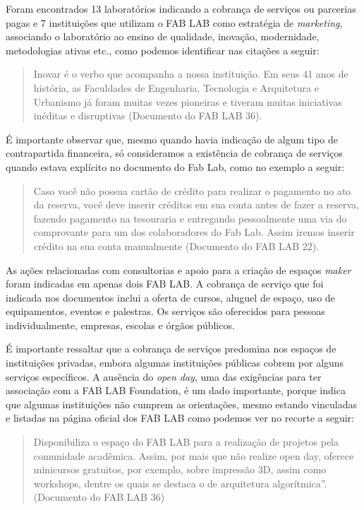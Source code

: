 \documentclass[portuguese]{textolivre}
\begin{document}
Foram encontrados 13 laboratórios indicando a cobrança de serviços ou parcerias pagas e 7 instituições que utilizam o FAB LAB como estratégia de \textit{marketing}, associando o laboratório ao ensino de qualidade, inovação, modernidade, metodologias ativas etc., como podemos identificar nas citações a seguir:

\begin{quote}
    Inovar é o verbo que acompanha a nossa instituição. Em seus 41 anos de história, as Faculdades de Engenharia, Tecnologia e Arquitetura e Urbanismo já foram muitas vezes pioneiras e tiveram muitas iniciativas inéditas e disruptivas (Documento do FAB LAB 36).
\end{quote}

É importante observar que, mesmo quando havia indicação de algum tipo de contrapartida financeira, só consideramos a existência de cobrança de serviços quando estava explícito no documento do Fab Lab, como no exemplo a seguir:

\begin{quote}
    Caso você não possua cartão de crédito para realizar o pagamento no ato da reserva, você deve inserir créditos em sua conta antes de fazer a reserva, fazendo pagamento na tesouraria e entregando pessoalmente uma via do comprovante para um dos colaboradores do Fab Lab. Assim iremos inserir crédito na sua conta manualmente (Documento do FAB LAB 22).
\end{quote}

As ações relacionadas com consultorias e apoio para a criação de espaços \textit{maker} foram indicadas em apenas dois FAB LAB. A cobrança de serviço que foi indicada nos documentos inclui a oferta de cursos, aluguel de espaço, uso de equipamentos, eventos e palestras. Os serviços são oferecidos para pessoas individualmente, empresas, escolas e órgãos públicos.

É importante ressaltar que a cobrança de serviços predomina nos espaços de instituições privadas, embora algumas instituições públicas cobrem por alguns serviços específicos. A ausência do \textit{open day}, uma das exigências para ter associação com a FAB LAB Foundation, é um dado importante, porque indica que algumas instituições não cumprem as orientações, mesmo estando vinculadas e listadas na página oficial dos FAB LAB como podemos ver no recorte a seguir:

\begin{quote}
    Disponibiliza o espaço do FAB LAB para a realização de projetos pela comunidade acadêmica. Assim, por mais que não realize open day, oferece minicursos gratuitos, por exemplo, sobre impressão 3D, assim como workshops, dentre os quais se destaca o de arquitetura algorítmica''. (Documento do FAB LAB 36)
\end{quote}
\end{document}
